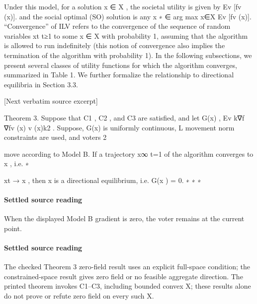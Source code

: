 \documentclass[10pt]{article}
\begin{document}
\begin{ReviewVerbatim}
Under this model, for a solution x ∈ X , the societal utility is given by Ev [fv (x)]. and the
social optimal (SO) solution is any x
                                         ∗ ∈ arg max
                                                    x∈X Ev [fv (x)].
   “Convergence” of    ILV refers to the convergence of the sequence of random variables
{xt }t≥1 to some x ∈ X with probability 1, assuming that the algorithm is allowed to run
indefinitely (this notion of convergence also implies the termination of the algorithm with
probability 1).
   In the following subsections, we present several classes of utility functions for which
the algorithm converges, summarized in Table 1. We further formalize the relationship to
directional equilibria in Section 3.3.

[Next verbatim source excerpt]

Theorem 3. Suppose that C1 , C2 , and C3 are satisfied, and let G(x) , Ev k∇f       ∇fv (x)
                                                                                     v (x)k2
                                                                                             .
Suppose, G(x) is uniformly continuous, L movement norm constraints are used, and voters
                                          2

move according to Model B. If a trajectory {x}∞    t=1 of the algorithm converges to x , i.e.
                                                                                       ∗

xt → x , then x is a directional equilibrium, i.e. G(x ) = 0.
      ∗        ∗                                       ∗
\end{ReviewVerbatim}

\paragraph{Settled source reading}
\begin{sloppypar}
When the displayed Model B gradient is zero, the voter remains at the current point.\allowbreak{}
\end{sloppypar}
\paragraph{Settled source reading}
\begin{sloppypar}
The checked Theorem 3 zero-\allowbreak{}field result uses an explicit full-\allowbreak{}space condition;\allowbreak{} the constrained-\allowbreak{}space result gives zero field or no feasible aggregate direction.\allowbreak{} The printed theorem invokes C1–C3, including bounded convex X;\allowbreak{} these results alone do not prove or refute zero field on every such X.\allowbreak{}
\end{sloppypar}
\end{document}
